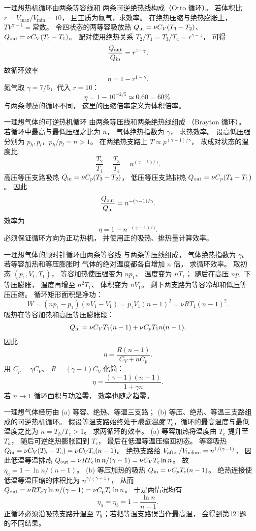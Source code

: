 一理想热机循环由两条等容线和
两条可逆绝热线构成（Otto 循环）。
若体积比 $r=V_{\max}/V_{\min}=10$，
且工质为氮气，求效率。
\exsolution
在绝热压缩与绝热膨胀上，
$TV^{\gamma-1}=\text{常数}$。
令四状态的两等容吸放热
$Q_{\rm in}=\nu C_V(T_3-T_2)$、
$Q_{\rm out}=\nu C_V(T_4-T_1)$。
配对使用绝热关系
$T_2/T_1=T_3/T_4=r^{\gamma-1}$，
可得
\[
\frac{Q_{\rm out}}{Q_{\rm in}}
=r^{1-\gamma}.
\]
故循环效率
\[
\boxed{\eta=1-r^{1-\gamma}}.
\]
氮气取 $\gamma=7/5$，代入 $r=10$：
\[
\boxed{\eta=1-10^{-2/5}\simeq0.60=60\%}.
\]
\excheck 与两条\emph{等压}的循环不同，
这里的压缩倍率定义为体积倍率。

一理想气体的可逆热机循环
由两条等压线和两条绝热线组成
（Brayton 循环）。
若循环中最高与最低压强之比为 $n$，
气体绝热指数为 $\gamma$，
求热效率。
\exsolution
设高低压强分别为
$p_h,p_l$，$p_h/p_l=n>1$。
在两绝热支路上
$T\propto p^{(\gamma-1)/\gamma}$，
故成对状态的温度比
\[
\frac{T_2}{T_1}=\frac{T_3}{T_4}
=n^{(\gamma-1)/\gamma}.
\]
高压等压支路吸热
$Q_{\rm in}=\nu C_p(T_3-T_2)$，
低压等压支路排热
$Q_{\rm out}=\nu C_p(T_4-T_1)$。
因此
\[
\frac{Q_{\rm out}}{Q_{\rm in}}
=n^{-(\gamma-1)/\gamma}.
\]
效率为
\[
\boxed{\eta=1-n^{-(\gamma-1)/\gamma}}.
\]
\excheck 必须保证循环方向为正功热机，
并使用正的吸热、排热量计算效率。

一理想气体的顺时针循环由两条等容线
与两条等压线组成，
气体绝热指数为 $\gamma$。
若等容加热和等压膨胀时
气体的绝对温度都各自增加 $n$ 倍，
求循环效率。
\exsolution
取初态
$(p_1,V_1,T_1)$，
等容加热使压强变为 $np_1$、
温度变为 $nT_1$；
随后在高压 $np_1$ 下等压膨胀，
温度再增至 $n^2T_1$、
体积变为 $nV_1$。
剩下两支路为等容冷却和低压等压压缩。
循环矩形面积是净功：
\[
W=(np_1-p_1)(nV_1-V_1)
=p_1V_1(n-1)^2
=\nu RT_1(n-1)^2.
\]
吸热在等容加热和高压等压膨胀段：
\[
Q_{\rm in}=\nu C_VT_1(n-1)
+\nu C_pT_1n(n-1).
\]
因此
\[
\eta=\frac{R(n-1)}{C_V+nC_p}.
\]
用 $C_p=\gamma C_V$、
$R=(\gamma-1)C_V$ 化简：
\[
\boxed{\eta=\frac{(\gamma-1)(n-1)}
{1+\gamma n}}.
\]
\excheck 若 $n\to1$ 循环面积与功趋零，
效率也随之趋零。

一理想气体经历由
(a) 等容、绝热、等温三支路；
(b) 等压、绝热、等温三支路组成的可逆热机循环。
假设等温支路始终处于\emph{最低温度}
$T_c$，循环的最高温度与最低温度之比为
$n=T_h/T_c>1$。
求两循环的效率。
\exsolution
(a) 等容加热将温度由 $T_c$ 提升至 $T_h$，
随后可逆绝热膨胀回到 $T_c$，
最后在低温等温压缩回初态。
等容吸热
$Q_{\rm in}=\nu C_V(T_h-T_c)
=\nu C_VT_c(n-1)$。
绝热支路给
$V_{\rm after}/V_{\rm before}
=n^{1/(\gamma-1)}$，
因此低温等温排热
$Q_{\rm out}=\nu RT_c\ln n/(\gamma-1)
=\nu C_VT_c\ln n$。
故
$\eta_a=1-\ln n/(n-1)$。
(b) 等压加热的吸热
$Q_{\rm in}=\nu C_pT_c(n-1)$。
绝热连接使低温等温压缩的体积比为
$n^{\gamma/(\gamma-1)}$，
从而
$Q_{\rm out}=\nu RT_c\gamma\ln n/(\gamma-1)
=\nu C_pT_c\ln n$。
于是两情况均有
\[
\boxed{\eta_a=\eta_b=1-\frac{\ln n}{n-1}}.
\]
\excheck 正循环必须沿吸热支路升温至
$T_h$；若把等温支路误当作最高温，
会得到第121题的不同结果。

